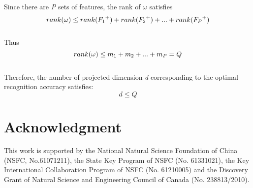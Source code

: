 \documentclass[journal]{IEEEtran}
\begin{document}
Since there are \emph{P} sets of features, the rank of $\omega$ satisfies
\begin{equation}
{{rank({\omega}}) }{\rm{ }} \le {rank({{F_1}^ +}})+{rank({{F_2}^ +}})+...+{rank({{F_P}^ +}})
\end{equation}\\\indent
Thus
\begin{equation}
{{rank({\omega}}) }{\rm{ }} \le {m_1}+{m_2}+...+{m_P}=Q
\end{equation}
\\\indent Therefore, the number of projected dimension \emph{d} corresponding to the optimal recognition accuracy satisfies:
\begin{equation}
d \le Q
\end{equation}

\section*{Acknowledgment}

This work is supported by the National Natural Science Foundation of China (NSFC, No.61071211), the State Key Program of NSFC (No. 61331021), the Key International Collaboration Program of NSFC (No. 61210005) and the Discovery Grant of Natural Science and Engineering Council of Canada (No. 238813/2010).


\ifCLASSOPTIONcaptionsoff
  \newpage
\fi




\end{document}
